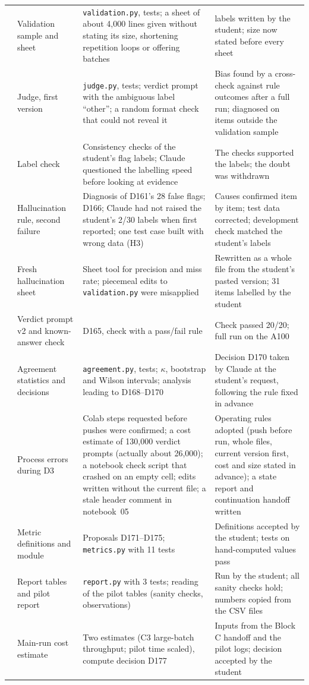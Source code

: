 \documentclass[11pt,a4paper]{report}
\begin{document}
{\begin{longtable}{
  >{\raggedright\arraybackslash}p{0.6cm}
  >{\raggedright\arraybackslash}p{4.4cm}
  >{\raggedright\arraybackslash}p{4.4cm}
  >{\raggedright\arraybackslash}p{4.8cm}}
88 & Validation sample and sheet
  & \texttt{validation.py}, tests; a sheet of about 4{,}000 lines given without stating its size, shortening repetition loops or offering batches
  & 425 labels written by the student; size now stated before every sheet \\
89 & Judge, first version
  & \texttt{judge.py}, tests; verdict prompt with the ambiguous label ``other''; a random format check that could not reveal it
  & Bias found by a cross-check against rule outcomes after a full run; diagnosed on items outside the validation sample \\
90 & Label check
  & Consistency checks of the student's flag labels; Claude questioned the labelling speed before looking at evidence
  & The checks supported the labels; the doubt was withdrawn \\
91 & Hallucination rule, second failure
  & Diagnosis of D161's 28 false flags; D166; Claude had not raised the student's 2/30 labels when first reported; one test case built with wrong data (H3)
  & Causes confirmed item by item; test data corrected; development check matched the student's labels \\
92 & Fresh hallucination sheet
  & Sheet tool for precision and miss rate; piecemeal edits to \texttt{validation.py} were misapplied
  & Rewritten as a whole file from the student's pasted version; 31 items labelled by the student \\
93 & Verdict prompt v2 and known-answer check
  & D165, check with a pass/fail rule
  & Check passed 20/20; full run on the A100 \\
94 & Agreement statistics and decisions
  & \texttt{agreement.py}, tests; $\kappa$, bootstrap and Wilson intervals; analysis leading to D168--D170
  & Decision D170 taken by Claude at the student's request, following the rule fixed in advance \\
95 & Process errors during D3
  & Colab steps requested before pushes were confirmed; a cost estimate of 130{,}000 verdict prompts (actually about 26{,}000); a notebook check script that crashed on an empty cell; edits written without the current file; a stale header comment in notebook~05
  & Operating rules adopted (push before run, whole files, current version first, cost and size stated in advance); a state report and continuation handoff written \\
96 & Metric definitions and module
  & Proposals D171--D175; \texttt{metrics.py} with 11 tests
  & Definitions accepted by the student; tests on hand-computed values pass \\
97 & Report tables and pilot report
  & \texttt{report.py} with 3 tests; reading of the pilot tables (sanity checks, observations)
  & Run by the student; all sanity checks hold; numbers copied from the CSV files \\
98 & Main-run cost estimate
  & Two estimates (C3 large-batch throughput; pilot time scaled), compute decision D177
  & Inputs from the Block C handoff and the pilot logs; decision accepted by the student \\


\end{longtable}}
\end{document}
